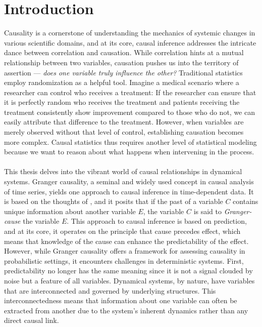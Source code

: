 \documentclass[11pt, a4paper]{memoir}
\theoremstyle{break}
\theoremstyle{break}
\theoremstyle{nonumberplain}
\begin{document}
\normalem

\newpage
\mainmatter

\chapter{Introduction}
Causality is a cornerstone of understanding the mechanics of systemic changes in various scientific domains, and at its core, causal inference addresses the intricate dance between correlation and causation. While correlation hints at a mutual relationship between two variables, causation pushes us into the territory of assertion — \textit{does one variable truly influence the other?} Traditional statistics employ randomization as a helpful tool. Imagine a medical scenario where a researcher can control who receives a treatment: If the researcher can ensure that it is perfectly random who receives the treatment and patients receiving the treatment consistently show improvement compared to those who do not, we can easily attribute that difference to the treatment. However, when variables are merely observed without that level of control, establishing causation becomes more complex. Causal statistics thus requires another level of statistical modeling because we want to reason about what happens when intervening in the process.\\\\
This thesis delves into the vibrant world of causal relationships in dynamical systems. Granger causality, a seminal and widely used concept in causal analysis of time series, yields one approach to causal inference in time-dependent data. It is based on the thoughts of \cite{Granger}, and it posits that if the past of a variable $C$ contains unique information about another variable $E$, the variable $C$ is said to \emph{Granger-cause} the variable $E$. This approach to causal inference is based on prediction, and at its core, it operates on the principle that cause precedes effect, which means that knowledge of the cause can enhance the predictability of the effect. However, while Granger causality offers a framework for assessing causality in probabilistic settings, it encounters challenges in deterministic systems. First, predictability no longer has the same meaning since it is not a signal clouded by noise but a feature of all variables. Dynamical systems, by nature, have variables that are interconnected and governed by underlying structures. This interconnectedness means that information about one variable can often be extracted from another due to the system's inherent dynamics rather than any direct causal link.\\\\
\end{document}
